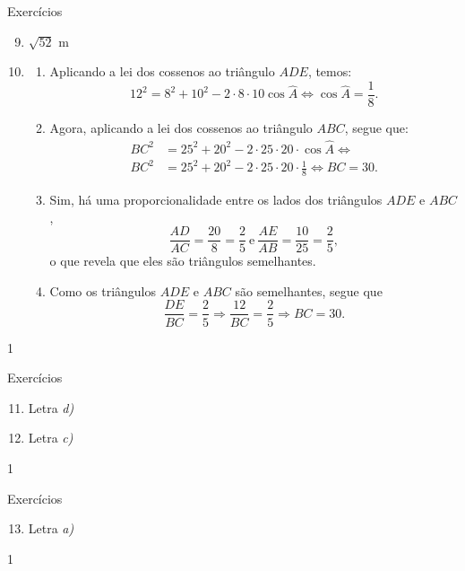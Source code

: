 \begin{answer}{Exercícios}
{\exerciselist
\begin{enumerate}\setcounter{enumi}{8}
\item $\sqrt{52}$ m
\item 
 \begin{enumerate}
       \item{} 
       Aplicando a lei dos cossenos ao triângulo $ADE$, temos:
       $$12^2=8^2+10^2-2\cdot 8 \cdot 10\cos\hat{A} \iff \cos\hat{A}=\frac{1}{8}.$$
       
       \item{}
       Agora, aplicando a lei dos cossenos ao triângulo $ABC$, segue que:
       \begin{align*}
       BC^2&=25^2+20^2-2\cdot 25 \cdot 20 \cdot \cos\hat{A} \iff \\
       BC^2&=25^2+20^2-2\cdot 25 \cdot 20 \cdot \frac{1}{8} \iff BC=30.
       \end{align*}
       
       \item{}
       Sim, há uma proporcionalidade entre os lados dos triângulos $ADE$ e $ABC$, 
       $$\frac{AD}{AC}=\frac{20}{8}=\frac{2}{5} \ \text{e} \ \frac{AE}{AB}=\frac{10}{25}=\frac{2}{5},$$
       o que revela que eles são triângulos semelhantes.
       
       \item{}
      Como os triângulos  $ADE$ e $ABC$ são semelhantes, segue que
      $$\frac{DE}{BC}=\frac{2}{5} \Rightarrow \frac{12}{BC}=\frac{2}{5} \Rightarrow BC=30.$$
   \end{enumerate}
\end{enumerate}
}{1}
\end{answer}
\clearmargin
\begin{answer}{Exercícios}
{\exerciselist
\begin{enumerate}\setcounter{enumi}{10}
\item Letra \textit{d)}
\item Letra \textit{c)}
\end{enumerate}
}{1}
\end{answer}
\clearmargin
\begin{answer}{Exercícios}
{\exerciselist
\begin{enumerate}\setcounter{enumi}{12}
\item Letra \textit{a)}
\end{enumerate}
}{1}
\end{answer}
\clearmargin
